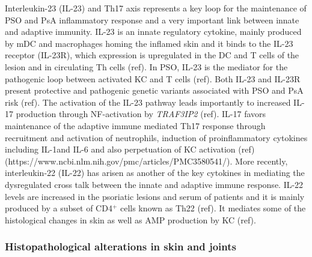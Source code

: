 Interleukin-23 (IL-23) and Th17 axis represents a key loop for the maintenance of PSO and PsA inflammatory response and a very important link between innate and adaptive immunity. IL-23 is an innate regulatory cytokine, mainly produced by mDC and macrophages homing the inflamed skin and it binds to the IL-23 receptor (IL-23R), which expression is upregulated in the DC and T cells of the lesion and in circulating Th cells (ref). In PSO, IL-23 is the mediator for the pathogenic loop between activated KC and T cells (ref). Both IL-23 and IL-23R present protective and pathogenic genetic variants associated with PSO and PsA risk (ref). The activation of the IL-23 pathway leads importantly to increased IL-17 production through NF-\kappaB activation by \textit{TRAF3IP2} (ref). IL-17 favors maintenance of the adaptive immune mediated Th17 response through recruitment and activation of neutrophils, induction of proinflammatory cytokines including IL-1\beta and IL-6 and also perpetuation of KC activation (ref) (https://www.ncbi.nlm.nih.gov/pmc/articles/PMC3580541/). %
More recently, interleukin-22 (IL-22) has arisen as another of the key cytokines in mediating the dysregulated cross talk between the innate and adaptive immune response. IL-22 levels are increased in the psoriatic lesions and serum of patients and it is mainly produced by a subset of CD4$^+$ cells known as Th22 (ref). It mediates some of the histological changes in skin as well as AMP production by KC (ref).


\subsubsection{Histopathological alterations in skin and joints}

